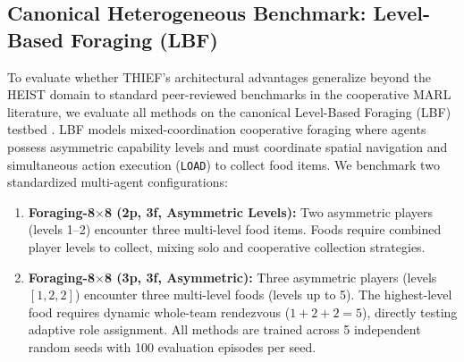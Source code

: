 \subsection{Canonical Heterogeneous Benchmark: Level-Based Foraging (LBF)}
\label{sec:setup_lbf}
To evaluate whether THIEF's architectural advantages generalize beyond the HEIST domain to standard peer-reviewed benchmarks in the cooperative MARL literature, we evaluate all methods on the canonical Level-Based Foraging (LBF) testbed \citep{papoudakis2021benchmarking}. LBF models mixed-coordination cooperative foraging where agents possess asymmetric capability levels and must coordinate spatial navigation and simultaneous action execution (\texttt{LOAD}) to collect food items. We benchmark two standardized multi-agent configurations:
\begin{enumerate}[leftmargin=*,nosep]
    \item \textbf{Foraging-8$\times$8 (2p, 3f, Asymmetric Levels):} Two asymmetric players (levels 1--2) encounter three multi-level food items. Foods require combined player levels to collect, mixing solo and cooperative collection strategies.
    \item \textbf{Foraging-8$\times$8 (3p, 3f, Asymmetric):} Three asymmetric players (levels $[1, 2, 2]$) encounter three multi-level foods (levels up to 5). The highest-level food requires dynamic whole-team rendezvous ($1 + 2 + 2 = 5$), directly testing adaptive role assignment. All methods are trained across 5 independent random seeds with 100 evaluation episodes per seed.
\end{enumerate}
